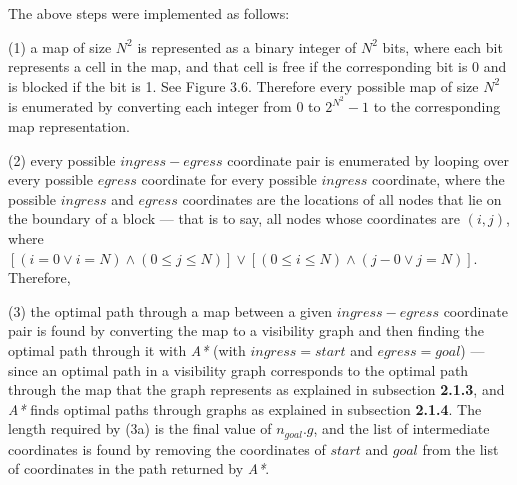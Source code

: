 \documentclass[12pt,notitlepage]{report}
\begin{document}
\noindent
The above steps were implemented as follows:
\begin{description}
\item (1) a map of size $N^{2}$ is represented as a binary integer of $N^{2}$ bits, where each bit represents a cell in the map, and that cell is free if the corresponding bit is 0 and is blocked if the bit is 1. See Figure 3.6. Therefore every possible map of size $N^{2}$ is enumerated by converting each integer from $0$ to $2^{N^{2}}-1$ to the corresponding map representation.
\item (2) every possible $ingress-egress$ coordinate pair is enumerated by looping over every possible $egress$ coordinate for every possible $ingress$ coordinate, where the possible $ingress$ and $egress$ coordinates are the locations of all nodes that lie on the boundary of a block --- that is to say, all nodes whose coordinates are $(i,j)$, where $[(i=0 \lor i=N) \land (0\leq j \leq N)] \lor [(0\leq i \leq N) \land (j-0 \lor j=N)]$. Therefore, 
\item (3) the optimal path through a map between a given $ingress-egress$ coordinate pair is found by converting the map to a visibility graph and then finding the optimal path through it with {\em A*} (with $ingress = start$ and $egress=goal$) --- since an optimal path in a visibility graph corresponds to the optimal path through the map that the graph represents as explained in subsection {\bfseries 2.1.3}, and {\em A*} finds optimal paths through graphs as explained in subsection {\bfseries 2.1.4}. The length required by (3a) is the final value of $n_{goal}.g$, and the list of intermediate coordinates is found by removing the coordinates of $start$ and $goal$ from the list of coordinates in the path returned by {\em A*}.
\end{description}
\end{document}
